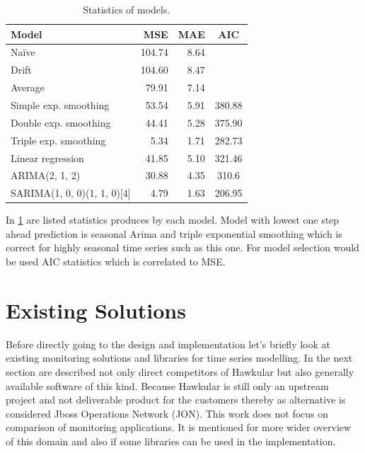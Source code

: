     \begin{table}[h]
        \begin{center}
            \begin{tabular}{l|r|r|c}
                    \textbf{Model} & \textbf{MSE} & \textbf{MAE} & \textbf{AIC} \\ \hline \hline
                    Na\"{i}ve & 104.74 & 8.64 & \\
                    Drift & 104.60 & 8.47 & \\
                    Average & 79.91 & 7.14 & \\ \hline
                    Simple exp. smoothing & 53.54 & 5.91 & 380.88 \\
                    Double exp. smoothing & 44.41 & 5.28 & 375.90 \\
                    Triple exp. smoothing & 5.34 & 1.71 & 282.73 \\ \hline
                    Linear regression & 41.85 & 5.10 & 321.46 \\ \hline
                    ARIMA(2, 1, 2) & 30.88 & 4.35 & 310.6 \\
                    SARIMA(1, 0, 0)(1, 1, 0)[4] & 4.79 & 1.63 & 206.95 \\
            \end{tabular}
            \caption{Statistics of models.}
            \label{tab:models-stat}
        \end{center}
    \end{table}

    In \ref{tab:models-stat} are listed statistics produces by each model. Model with lowest one step ahead prediction
    is seasonal Arima and triple exponential smoothing which is correct for highly seasonal time series such as this
    one. For model selection would be used AIC statistics which is correlated to MSE.

\chapter{Existing Solutions}
Before directly going to the design and implementation let's briefly look at existing monitoring solutions and libraries
for time series modelling. In the next section are described not only direct competitors of Hawkular but also
generally available software of this kind. Because Hawkular is still only an upstream project and not deliverable
product for the customers thereby as alternative is considered Jboss Operations Network (JON). This work does not
focus on comparison of monitoring applications. It is mentioned for more wider overview of this domain and also
if some libraries can be used in the implementation.

